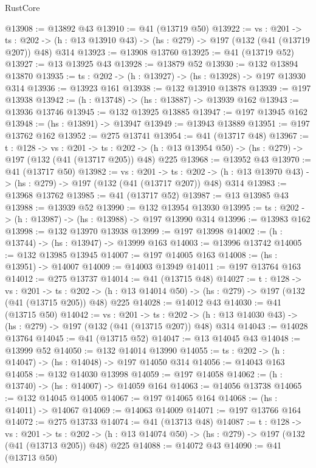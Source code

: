 \begin{lexlean}{RustCore}
\begin{coremodule}
@13908 := @13892 @43
@13910 := @41 (@13719 @50)
@13922 := {vs : @201} ->
  {ts : @202} -> (h : @13 @13910 @43) -> (hs : @279) -> @197 (@132 (@41 (@13719 @207)) @48) @314
@13923 := @13908 @13760
@13925 := @41 (@13719 @52)
@13927 := @13 @13925 @43
@13928 := @13879 @52
@13930 := @132 @13894 @13870
@13935 := {ts : @202} -> (h : @13927) -> (hs : @13928) -> @197 @13930 @314
@13936 := @13923 @161
@13938 := @132 @13910 @13878
@13939 := @197 @13938
@13942 := (h : @13748) -> (hs : @13887) -> @13939 @162
@13943 := @13936 @13746
@13945 := @132 @13925 @13885
@13947 := @197 @13945 @162
@13948 := (hs : @13891) -> @13947
@13949 := @13943 @13889
@13951 := @197 @13762 @162
@13952 := @275 @13741
@13954 := @41 (@13717 @48)
@13967 := {t : @128} ->
  {vs : @201} ->
  {ts : @202} -> (h : @13 @13954 @50) -> (hs : @279) -> @197 (@132 (@41 (@13717 @205)) @48) @225
@13968 := @13952 @43
@13970 := @41 (@13717 @50)
@13982 := {vs : @201} ->
  {ts : @202} -> (h : @13 @13970 @43) -> (hs : @279) -> @197 (@132 (@41 (@13717 @207)) @48) @314
@13983 := @13968 @13762
@13985 := @41 (@13717 @52)
@13987 := @13 @13985 @43
@13988 := @13939 @52
@13990 := @132 @13954 @13930
@13995 := {ts : @202} -> (h : @13987) -> (hs : @13988) -> @197 @13990 @314
@13996 := @13983 @162
@13998 := @132 @13970 @13938
@13999 := @197 @13998
@14002 := (h : @13744) -> (hs : @13947) -> @13999 @163
@14003 := @13996 @13742
@14005 := @132 @13985 @13945
@14007 := @197 @14005 @163
@14008 := (hs : @13951) -> @14007
@14009 := @14003 @13949
@14011 := @197 @13764 @163
@14012 := @275 @13737
@14014 := @41 (@13715 @48)
@14027 := {t : @128} ->
  {vs : @201} ->
  {ts : @202} -> (h : @13 @14014 @50) -> (hs : @279) -> @197 (@132 (@41 (@13715 @205)) @48) @225
@14028 := @14012 @43
@14030 := @41 (@13715 @50)
@14042 := {vs : @201} ->
  {ts : @202} -> (h : @13 @14030 @43) -> (hs : @279) -> @197 (@132 (@41 (@13715 @207)) @48) @314
@14043 := @14028 @13764
@14045 := @41 (@13715 @52)
@14047 := @13 @14045 @43
@14048 := @13999 @52
@14050 := @132 @14014 @13990
@14055 := {ts : @202} -> (h : @14047) -> (hs : @14048) -> @197 @14050 @314
@14056 := @14043 @163
@14058 := @132 @14030 @13998
@14059 := @197 @14058
@14062 := (h : @13740) -> (hs : @14007) -> @14059 @164
@14063 := @14056 @13738
@14065 := @132 @14045 @14005
@14067 := @197 @14065 @164
@14068 := (hs : @14011) -> @14067
@14069 := @14063 @14009
@14071 := @197 @13766 @164
@14072 := @275 @13733
@14074 := @41 (@13713 @48)
@14087 := {t : @128} ->
  {vs : @201} ->
  {ts : @202} -> (h : @13 @14074 @50) -> (hs : @279) -> @197 (@132 (@41 (@13713 @205)) @48) @225
@14088 := @14072 @43
@14090 := @41 (@13713 @50)

\end{coremodule}
\end{lexlean}
